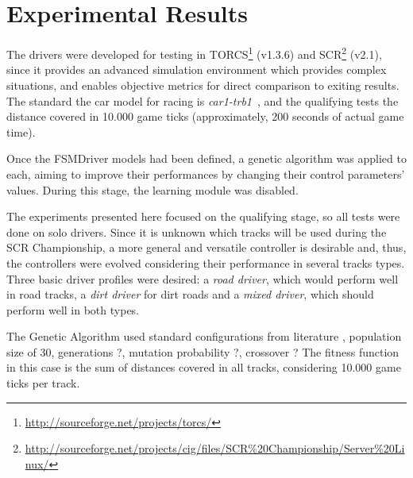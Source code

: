 \section{Experimental Results}\label{sec:4}%


The drivers were developed for testing in TORCS\footnote{\url{http://sourceforge.net/projects/torcs/}} (v1.3.6) and
SCR\footnote{\url{http://sourceforge.net/projects/cig/files/SCR\%20Championship/Server\%20Linux/}} (v2.1), since it provides an advanced simulation environment which provides complex situations, and enables objective metrics for direct comparison to exiting results. The standard the car model for racing is \emph{car1-trb1}~\cite{SCR}, and the qualifying tests the distance covered in 10.000 game ticks (approximately, 200 seconds of actual game time).

Once the FSMDriver models had been defined, a genetic algorithm was applied to each, aiming to improve their performances by changing their control parameters' values. During this stage, the learning module was disabled.

The experiments presented here focused on the qualifying stage, so all tests were done on solo drivers. Since it is unknown which tracks will be used during the SCR Championship, a more general and versatile controller is desirable and, thus, the controllers were evolved considering their performance in several tracks types. Three basic driver profiles were desired: a \emph{road driver}, which would perform well in road tracks, a \emph{dirt driver} for dirt roads and a \emph{mixed driver}, which should perform well in both types.

The Genetic Algorithm used standard configurations from literature , population size of 30, generations ?, mutation probability ?, crossover ?   %
The fitness function in this case is the sum of distances covered in all tracks, considering 10.000 game ticks per track.

